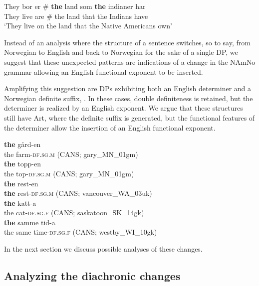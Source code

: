 \documentclass[output=paper]{langscibook}
\begin{document}
\ex
\gll They bor er \# \textbf{the} land som \textbf{the} indianer har\\
	 They live are \# the land that the Indians have\\
\glt ‘They live on the land that the Native Americans own’
\z
\z



Instead of an analysis where the structure of a sentence switches, so to say, from Norwegian to English and back to Norwegian for the sake of a single DP, we suggest that these unexpected patterns are indications of a change in the NAmNo grammar allowing an English functional exponent to be inserted. 



Amplifying this suggestion are DPs exhibiting both an English determiner and a Norwegian definite suffix, . In these cases, double definiteness is retained, but the determiner is realized by an English exponent. We argue that these structures still have Art, where the definite suffix is generated, but the functional features of the determiner allow the insertion of an English functional exponent.  


\ea\label{ex:riksem:28}
\ea \label{ex:riksem:28a}
\gll \textbf{the} gård-en\\
	 the farm-\textsc{df.sg.m} (CANS; gary\_MN\_01gm)\\
\ex \label{ex:riksem:28b}
\gll \textbf{the} topp-en\\
	 the top-\textsc{df.sg.m} (CANS; gary\_MN\_01gm)\\
\ex \label{ex:riksem:28c}
\gll \textbf{the} rest-en\\
	 \textbf{the} rest-\textsc{df.sg.m} (CANS; %
     vancouver\_WA\_03uk)\\
\ex \label{ex:riksem:28d}
\gll \textbf{the} katt-a\\
	 the cat-\textsc{df.sg.f}  (CANS; %
     saskatoon\_SK\_14gk)\\
\ex \label{ex:riksem:28e} 
\gll \textbf{the} samme tid-a\\
	 the same time-\textsc{df.sg.f} (CANS; %
     westby\_WI\_10gk)\\
\z
\z

In the next section we discuss possible analyses of these changes. 


\subsection{Analyzing the diachronic changes}\label{sec:riksem:5.3}
\end{document}
